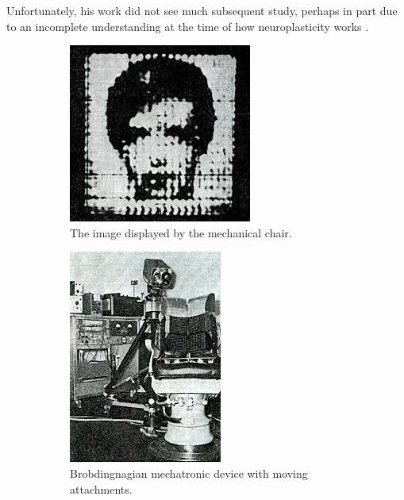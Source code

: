 \documentclass[
12pt, %
oneside, %
english, %
doublespacing, %
headsepline, %
]{MastersDoctoralThesis} %
\begin{document}
Unfortunately, his work did not see much subsequent study, perhaps in part due to an incomplete understanding at the time of how neuroplasticity works \parencite{doidge_brain_2008}.

\begin{figure}[th]
	\centering
  \begin{subfigure}[b]{0.4\textwidth}
		\centering
    \includegraphics[height=0.75\textwidth]{images/K7PqL}
		\decoRule
    \caption[Mechanical Chair Image]{The image displayed by the mechanical chair.}
    \label{fig:chair_image}
  \end{subfigure}
  \begin{subfigure}[b]{0.4\textwidth}
		\centering
    \includegraphics[height=0.75\textwidth]{images/fnJ33}
		\decoRule
    \caption[Mechanical Chair]{Brobdingnagian mechatronic device with moving attachments.}
    \label{fig:chair}
  \end{subfigure}
	\caption[Mechanical apparatus for sensory substitution]{}
\end{figure}
\end{document}
